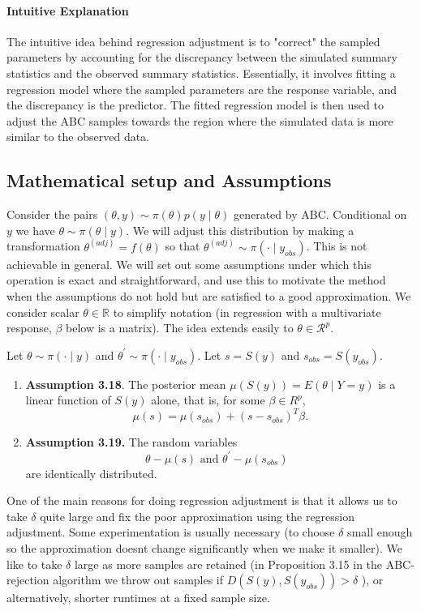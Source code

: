 \documentclass{article}
\begin{document}
\paragraph{Intuitive Explanation}
The intuitive idea behind regression adjustment is to "correct" the sampled parameters by accounting for the discrepancy between the simulated summary statistics and the observed summary statistics. Essentially, it involves fitting a regression model where the sampled parameters are the response variable, and the discrepancy is the predictor. The fitted regression model is then used to adjust the ABC samples towards the region where the simulated data is more similar to the observed data.

\subsection{Mathematical setup and Assumptions}
Consider the pairs $(\theta, y) \sim \pi(\theta) p(y \mid \theta)$ generated by ABC. Conditional on $y$ we have $\theta \sim \pi(\theta \mid y)$. We will adjust this distribution by making a transformation $\theta^{(a d j)}=f(\theta)$ so that $\theta^{(a d j)} \sim \pi\left(\cdot \mid y_{o b s}\right)$. This is not achievable in general. We will set out some assumptions under which this operation is exact and straightforward, and use this to motivate the method when the assumptions do not hold but are satisfied to a good approximation. We consider scalar $\theta \in \mathbb{R}$ to simplify notation (in regression with a multivariate response, $\beta$ below is a matrix). The idea extends easily to $\theta \in \mathcal{R}^p$.

Let $\theta \sim \pi(\cdot \mid y)$ and $\theta^{\prime} \sim \pi\left(\cdot \mid y_{o b s}\right)$. Let $s=S(y)$ and $s_{o b s}=S\left(y_{o b s}\right)$.

\begin{enumerate}
    \item \textbf{Assumption 3.18}. The posterior mean $\mu(S(y))=E(\theta \mid Y=y)$ is a linear function of $S(y)$ alone, that is, for some $\beta \in R^p$,
$$
\mu(s)=\mu\left(s_{o b s}\right)+\left(s-s_{o b s}\right)^T \beta .
$$
\item \textbf{Assumption 3.19.} The random variables $$\theta-\mu(s) \text { and } \theta^{\prime}-\mu\left(s_{o b s}\right) \text { }$$are identically distributed. 
\end{enumerate}

One of the main reasons for doing regression adjustment is that it allows us to take $\delta$ quite large and fix the poor approximation using the regression adjustment. Some experimentation is usually necessary (to choose $\delta$ small enough so the approximation doesnt change significantly when we make it smaller). We like to take $\delta$ large as more samples are retained (in Proposition 3.15 in the ABC-rejection algorithm we throw out samples if $D\left(S(y), S\left(y_{o b s}\right)\right)>\delta$ ), or alternatively, shorter runtimes at a fixed sample size.
\end{document}
